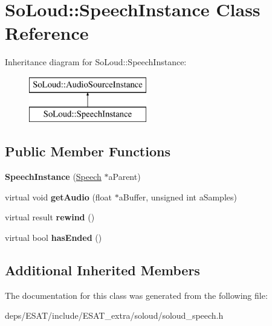 \hypertarget{class_so_loud_1_1_speech_instance}{}\section{So\+Loud\+:\+:Speech\+Instance Class Reference}
\label{class_so_loud_1_1_speech_instance}
Inheritance diagram for So\+Loud\+:\+:Speech\+Instance\+:\begin{figure}[H]
\begin{center}
\leavevmode
\includegraphics[height=2.000000cm]{class_so_loud_1_1_speech_instance}
\end{center}
\end{figure}
\subsection*{Public Member Functions}
\begin{DoxyCompactItemize}
\item 
\mbox{\label{class_so_loud_1_1_speech_instance_a7fa645d0413fa76f3a7c6b4bd38e2602}} 
{\bfseries Speech\+Instance} (\mbox{\hyperlink{class_so_loud_1_1_speech}{Speech}} $\ast$a\+Parent)
\item 
\mbox{\label{class_so_loud_1_1_speech_instance_aa279d6315a73f086279e5469f1e2e7dd}} 
virtual void {\bfseries get\+Audio} (float $\ast$a\+Buffer, unsigned int a\+Samples)
\item 
\mbox{\label{class_so_loud_1_1_speech_instance_a77294a31b9d70a07bc7ad3c0ecd8e843}} 
virtual result {\bfseries rewind} ()
\item 
\mbox{\label{class_so_loud_1_1_speech_instance_a85f5788b39f0e1b7b68328706da81f1d}} 
virtual bool {\bfseries has\+Ended} ()
\end{DoxyCompactItemize}
\subsection*{Additional Inherited Members}


The documentation for this class was generated from the following file\+:\begin{DoxyCompactItemize}
\item 
deps/\+E\+S\+A\+T/include/\+E\+S\+A\+T\+\_\+extra/soloud/soloud\+\_\+speech.\+h\end{DoxyCompactItemize}
